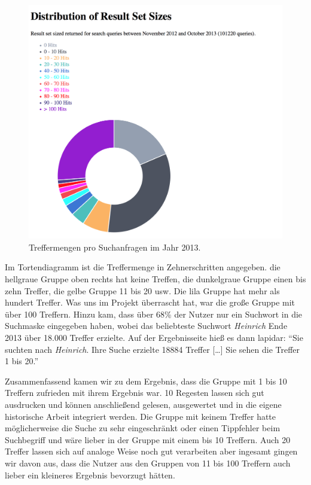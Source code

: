 \documentclass[ngerman,]{scrreprt}
\begin{document}
\begin{figure}
\centering
\includegraphics{Bilder/2012-Nutzungsformen_der_RI.png}
\caption{Treffermengen pro Suchanfragen im Jahr 2013.}
\end{figure}

Im Tortendiagramm ist die Treffermenge in Zehnerschritten angegeben. die hellgraue Gruppe oben rechts hat keine Treffen, die dunkelgraue Gruppe einen bis zehn Treffer, die gelbe Gruppe 11 bis 20 usw. Die lila Gruppe hat mehr als hundert Treffer. Was uns im Projekt überrascht hat, war die große Gruppe mit über 100 Treffern. Hinzu kam, dass über 68\% der Nutzer nur ein Suchwort in die Suchmaske eingegeben haben, wobei das beliebteste Suchwort \emph{Heinrich} Ende 2013 über 18.000 Treffer erzielte. Auf der Ergebnisseite hieß es dann lapidar: ``Sie suchten nach \emph{Heinrich}. Ihre Suche erzielte 18884 Treffer {[}\ldots{}{]} Sie sehen die Treffer 1 bis 20.''

Zusammenfassend kamen wir zu dem Ergebnis, dass die Gruppe mit 1 bis 10 Treffern zufrieden mit ihrem Ergebnis war. 10 Regesten lassen sich gut ausdrucken und können anschließend gelesen, ausgewertet und in die eigene historische Arbeit integriert werden. Die Gruppe mit keinem Treffer hatte möglicherweise die Suche zu sehr eingeschränkt oder einen Tippfehler beim Suchbegriff und wäre lieber in der Gruppe mit einem bis 10 Treffern. Auch 20 Treffer lassen sich auf analoge Weise noch gut verarbeiten aber ingesamt gingen wir davon aus, dass die Nutzer aus den Gruppen von 11 bis 100 Treffern auch lieber ein kleineres Ergebnis bevorzugt hätten.
\end{document}
